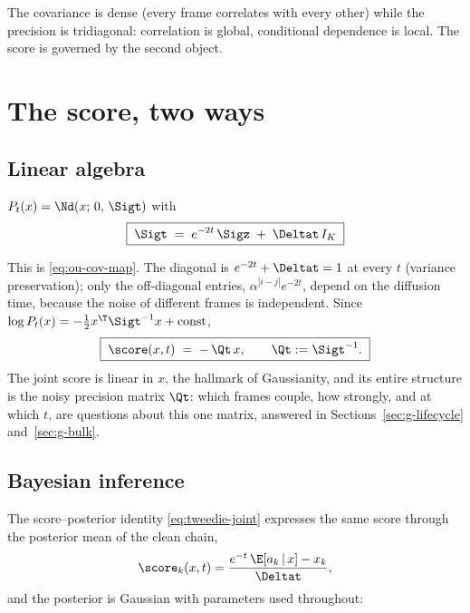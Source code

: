 The covariance is dense (every frame correlates with every other) while
the precision is tridiagonal: correlation is global, conditional
dependence is local. The score is governed by the second object.

\section{The score, two ways}\label{sec:g-score}

\subsection{Linear algebra}

\begin{proposition}\label{prop:g-Sigt}
$P_t(x) = \Nd(x;\, 0,\, \Sigt)$ with
\begin{equation}
  \boxed{\;\Sigt \;=\; e^{-2t}\, \Sigz \;+\; \Deltat\, I_K\;}
  \label{eq:g-Sigt}
\end{equation}
\end{proposition}
This is \eqref{eq:ou-cov-map}. The diagonal is
$e^{-2t} + \Deltat = 1$ at every $t$ (variance preservation); only the
off-diagonal entries, $\alpha^{|i-j|} e^{-2t}$, depend on the diffusion
time, because the noise of different frames is independent. Since
$\log P_t(x) = -\tfrac{1}{2} x^\T \Sigt^{-1} x + \text{const}$,
\begin{equation}
  \boxed{\;\score(x, t) \;=\; -\,\Qt\, x,
  \qquad \Qt := \Sigt^{-1}.\;}
  \label{eq:g-score-matrix}
\end{equation}
The joint score is linear in $x$, the hallmark of Gaussianity, and its
entire structure is the noisy precision matrix $\Qt$: which frames couple,
how strongly, and at which $t$, are questions about this one matrix,
answered in Sections~\ref{sec:g-lifecycle} and~\ref{sec:g-bulk}.

\subsection{Bayesian inference}

The score--posterior identity \eqref{eq:tweedie-joint} expresses the same
score through the posterior mean of the clean chain,
\begin{equation}
  \score_k(x, t)
  = \frac{e^{-t}\, \E[a_k \,|\, x] - x_k}{\Deltat} ,
  \label{eq:g-tweedie}
\end{equation}
and the posterior is Gaussian with parameters used throughout:

